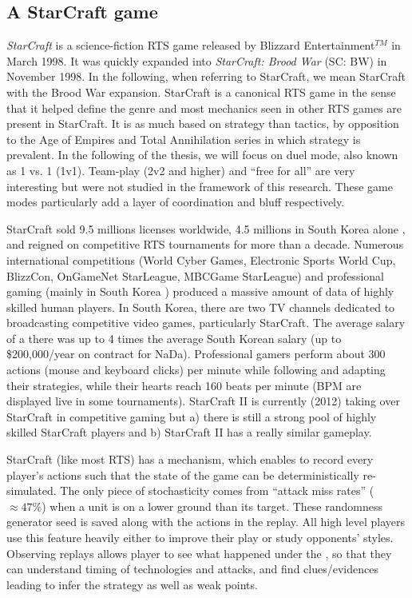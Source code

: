 \subsection{A StarCraft game}
\label{sec:astarcraftgame}
\textit{StarCraft} is a science-fiction RTS game released by Blizzard Entertainment$^{TM}$ in March 1998. It was quickly expanded into \textit{StarCraft: Brood War} (SC: BW) in November 1998. In the following, when referring to StarCraft, we mean StarCraft with the Brood War expansion. StarCraft is a canonical RTS game in the sense that it helped define the genre and most  mechanics seen in other RTS games are present in StarCraft. It is as much based on strategy than tactics, by opposition to the Age of Empires and Total Annihilation series in which strategy is prevalent. In the following of the thesis, we will focus on duel mode, also known as 1 vs. 1 (1v1). Team-play (2v2 and higher) and ``free for all'' are very interesting but were not studied in the framework of this research. These game modes particularly add a layer of coordination and bluff respectively.


StarCraft sold 9.5 millions licenses worldwide, 4.5 millions in South Korea alone \citep{StarCraftNumbers}, and reigned on competitive RTS tournaments for more than a decade. Numerous international competitions (World Cyber Games, Electronic Sports World Cup, BlizzCon, OnGameNet StarLeague, MBCGame StarLeague) and professional gaming (mainly in South Korea \citep{Chee05}) produced a massive amount of data of highly skilled human players. In South Korea, there are two TV channels dedicated to broadcasting competitive video games, particularly StarCraft. The average salary of a  there was up to 4 times the average South Korean salary \citep{MYMPGM} (up to \$200,000/year on contract for NaDa). Professional gamers perform about 300 actions (mouse and keyboard clicks) per minute while following and adapting their strategies, while their hearts reach 160 beats per minute (BPM are displayed live in some tournaments). StarCraft II is currently (2012) taking over StarCraft in competitive gaming but a) there is still a strong pool of highly skilled StarCraft players and b) StarCraft II has a really similar gameplay.


StarCraft (like most RTS) has a \textit{} mechanism, which enables to record every player's actions such that the state of the game can be deterministically re-simulated. The only piece of stochasticity comes from ``attack miss rates'' ($\approx 47\%$) when a unit is on a lower ground than its target. These randomness generator seed is saved along with the actions in the replay. All high level players use this feature heavily either to improve their play or study opponents' styles. Observing replays allows player to see what happened under the \textit{}, so that they can understand timing of technologies and attacks, and find clues/evidences leading to infer the strategy as well as weak points.


